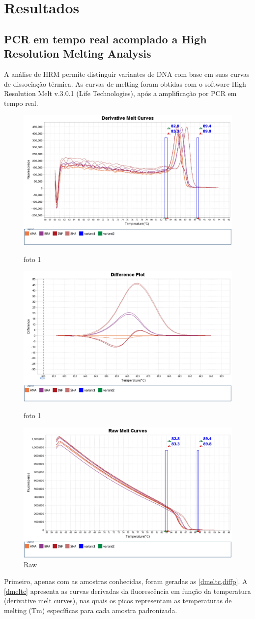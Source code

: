 \section{Resultados}
\subsection{PCR em tempo real acomplado a High Resolution Melting Analysis}

A análise de HRM permite distinguir variantes de DNA com base em suas curvas de
dissociação térmica. As curvas de melting foram obtidas com o software High
Resolution Melt v.3.0.1 (Life Technologies), após a amplificação por PCR em
tempo real.

\begin{figure}
        \centering
        \includegraphics[width=.4\textwidth]{fig/Derivative Melt Curves.jpg}
        \caption{foto 1}
        \label{dmeltc}
        \includegraphics[width=.4\textwidth]{fig/Difference Plot.jpg}
        \caption{foto 1}
        \label{diffp}
        \includegraphics[width=.4\textwidth]{fig/Raw Melt Curves.jpg}
        \caption{Raw}
        \label{rawmelt}
\end{figure} %

Primeiro, apenas com as amostras conhecidas, foram geradas as
\cref{dmeltc,diffp}. A
\cref{dmeltc} apresenta as curvas derivadas da fluorescência em função da
temperatura (derivative melt curves), nas quais os picos representam as
temperaturas de melting (Tm) específicas para cada amostra padronizada.

